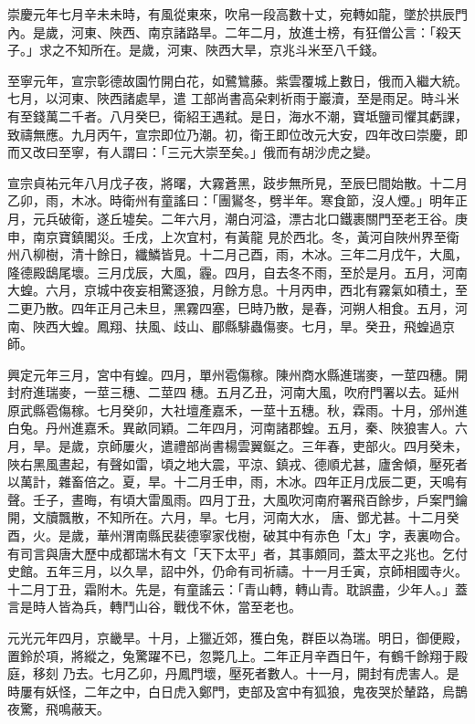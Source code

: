 \begin{pinyinscope}
 崇慶元年七月辛未未時，有風從東來，吹帛一段高數十丈，宛轉如龍，墜於拱辰門內。是歲，河東、陜西、南京諸路旱。二年二月，放進士榜，有狂僧公言：「殺天子。」求之不知所在。是歲，河東、陜西大旱，京兆斗米至八千錢。



 至寧元年，宣宗彰德故園竹開白花，如鷺鷥藤。紫雲覆城上數日，俄而入繼大統。七月，以河東、陜西諸處旱，遣
 工部尚書高朵剌祈雨于巖瀆，至是雨足。時斗米有至錢萬二千者。八月癸巳，衛紹王遇弒。是日，海水不潮，寶坻鹽司懼其虧課，致禱無應。九月丙午，宣宗即位乃潮。初，衛王即位改元大安，四年改曰崇慶，即而又改曰至寧，有人謂曰：「三元大崇至矣。」俄而有胡沙虎之變。



 宣宗貞祐元年八月戊子夜，將曙，大霧蒼黑，跂步無所見，至辰巳間始散。十二月乙卯，雨，木冰。時衛州有童謠曰：「團鸑冬，劈半年。寒食節，沒人煙。」明年正月，元兵破衛，遂丘墟矣。二年六月，潮白河溢，漂古北口鐵裹關門至老王谷。庚申，南京寶鎮閣災。壬戌，上次宜村，有黃龍
 見於西北。冬，黃河自陜州界至衛州八柳樹，清十餘日，纖鱗皆見。十二月己酉，雨，木冰。三年二月戊午，大風，隆德殿鴟尾壞。三月戊辰，大風，霾。四月，自去冬不雨，至於是月。五月，河南大蝗。六月，京城中夜妄相驚逐狼，月餘方息。十月丙申，西北有霧氣如積土，至二更乃散。四年正月己未旦，黑霧四塞，巳時乃散，是春，河朔人相食。五月，河南、陜西大蝗。鳳翔、扶風、歧山、郿縣騑蟲傷麥。七月，旱。癸丑，飛蝗過京師。



 興定元年三月，宮中有蝗。四月，單州雹傷稼。陳州商水縣進瑞麥，一莖四穗。開封府進瑞麥，一莖三穗、二莖四
 穗。五月乙丑，河南大風，吹府門署以去。延州原武縣雹傷稼。七月癸卯，大社壇產嘉禾，一莖十五穗。秋，霖雨。十月，邠州進白兔。丹州進嘉禾。異畝同穎。二年四月，河南諸郡蝗。五月，秦、陜狼害人。六月，旱。是歲，京師屢火，遣禮部尚書楊雲翼鋋之。三年春，吏部火。四月癸未，陜右黑風晝起，有聲如雷，頃之地大震，平涼、鎮戎、德順尤甚，廬舍傾，壓死者以萬計，雜畜倍之。夏，旱。十二月壬申，雨，木冰。四年正月戊辰二更，天鳴有聲。壬子，晝晦，有頃大雷風雨。四月丁丑，大風吹河南府署飛百餘步，戶案門鑰開，文牘飄散，不知所在。六月，旱。七月，河南大水，
 唐、鄧尤甚。十二月癸酉，火。是歲，華州渭南縣民裴德寧家伐樹，破其中有赤色「太」字，表裏吻合。有司言與唐大歷中成都瑞木有文「天下太平」者，其事頗同，蓋太平之兆也。乞付史館。五年三月，以久旱，詔中外，仍命有司祈禱。十一月壬寅，京師相國寺火。十二月丁丑，霜附木。先是，有童謠云：「青山轉，轉山青。耽誤盡，少年人。」蓋言是時人皆為兵，轉鬥山谷，戰伐不休，當至老也。



 元光元年四月，京畿旱。十月，上獵近郊，獲白兔，群臣以為瑞。明日，御便殿，置鈴於項，將縱之，兔驚躍不已，忽斃几上。二年正月辛酉日午，有鶴千餘翔于殿庭，移刻
 乃去。七月乙卯，丹鳳門壞，壓死者數人。十一月，開封有虎害人。是時屢有妖怪，二年之中，白日虎入鄭門，吏部及宮中有狐狼，鬼夜哭於輦路，烏鵲夜驚，飛鳴蔽天。




\end{pinyinscope}
